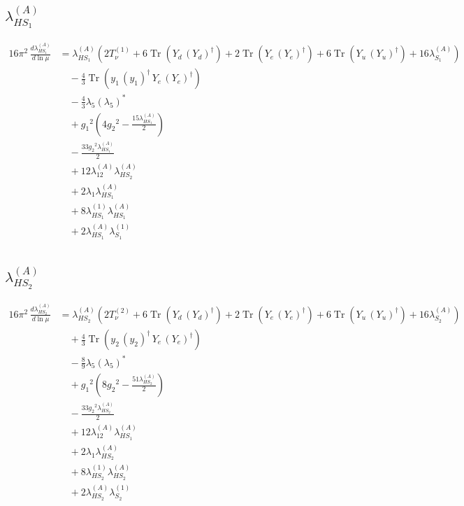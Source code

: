 \documentclass[10pt,a4paper]{article}
\begin{document}
\subsection*{$\lambda_{HS_1}^{(A)}$}
\begin{align*}
16\pi^2\,\frac{d \lambda_{HS_1}^{(A)}}{d\ln\mu} &={\lambda_{HS_1}^{(A)}} (2 T_{\nu}^{(1)}+6 \operatorname{Tr}\!\left({Y_d}\,\left({Y_d}\right)^{\dagger}\right)+2 \operatorname{Tr}\!\left({Y_e}\,\left({Y_e}\right)^{\dagger}\right)+6 \operatorname{Tr}\!\left({Y_u}\,\left({Y_u}\right)^{\dagger}\right)+16 {\lambda_{S_1}^{(A)}}) \\
&\quad -\frac{4}{3} \operatorname{Tr}\!\left({y_1}\,\left({y_1}\right)^{\dagger}\,{Y_e}\,\left({Y_e}\right)^{\dagger}\right) \\
&\quad -\frac{4}{3} {\lambda_5} \left({\lambda_5}\right)^{*} \\
&\quad +{g_1}^2 \left(4 {g_2}^2-\frac{15 {\lambda_{HS_1}^{(A)}}}{2}\right) \\
&\quad -\frac{33 {g_2}^2 {\lambda_{HS_1}^{(A)}}}{2} \\
&\quad +12 {\lambda_{12}^{(A)}} {\lambda_{HS_2}^{(A)}} \\
&\quad +2 {\lambda_1} {\lambda_{HS_1}^{(A)}} \\
&\quad +8 {\lambda_{HS_1}^{(1)}} {\lambda_{HS_1}^{(A)}} \\
&\quad +2 {\lambda_{HS_1}^{(A)}} {\lambda_{S_1}^{(1)}} \\
\end{align*}
\subsection*{$\lambda_{HS_2}^{(A)}$}
\begin{align*}
16\pi^2\,\frac{d \lambda_{HS_2}^{(A)}}{d\ln\mu} &={\lambda_{HS_2}^{(A)}} (2 T_{\nu}^{(2)}+6 \operatorname{Tr}\!\left({Y_d}\,\left({Y_d}\right)^{\dagger}\right)+2 \operatorname{Tr}\!\left({Y_e}\,\left({Y_e}\right)^{\dagger}\right)+6 \operatorname{Tr}\!\left({Y_u}\,\left({Y_u}\right)^{\dagger}\right)+16 {\lambda_{S_2}^{(A)}}) \\
&\quad +\frac{4}{3} \operatorname{Tr}\!\left({y_2}\,\left({y_2}\right)^{\dagger}\,{Y_e}\,\left({Y_e}\right)^{\dagger}\right) \\
&\quad -\frac{8}{9} {\lambda_5} \left({\lambda_5}\right)^{*} \\
&\quad +{g_1}^2 \left(8 {g_2}^2-\frac{51 {\lambda_{HS_2}^{(A)}}}{2}\right) \\
&\quad -\frac{33 {g_2}^2 {\lambda_{HS_2}^{(A)}}}{2} \\
&\quad +12 {\lambda_{12}^{(A)}} {\lambda_{HS_1}^{(A)}} \\
&\quad +2 {\lambda_1} {\lambda_{HS_2}^{(A)}} \\
&\quad +8 {\lambda_{HS_2}^{(1)}} {\lambda_{HS_2}^{(A)}} \\
&\quad +2 {\lambda_{HS_2}^{(A)}} {\lambda_{S_2}^{(1)}} \\
\end{align*}
\end{document}
